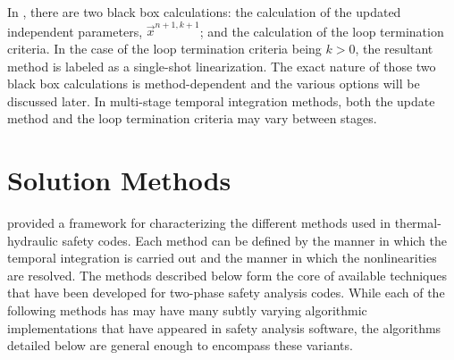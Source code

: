 In , there are two black box calculations: the calculation of the updated independent parameters, $\vec{x}^{n+1,k+1}$; and the calculation of the loop termination criteria.
In the case of the loop termination criteria being $k > 0$, the resultant method is labeled as a single-shot linearization.
The exact nature of those two black box calculations is method-dependent and the various options will be discussed later.
In multi-stage temporal integration methods, both the update method and the loop termination criteria may vary between stages. 

\section{Solution Methods}
\label{sect:solution_techniques}

 provided a framework for characterizing the different methods used in thermal-hydraulic safety codes. 
Each method can be defined by the manner in which the temporal integration is carried out and the manner in which the nonlinearities are resolved.
The methods described below form the core of available techniques that have been developed for two-phase safety analysis codes. 
While each of the following methods has may have many subtly varying algorithmic implementations that have appeared in safety analysis software, the algorithms detailed below are general enough to encompass these variants.

